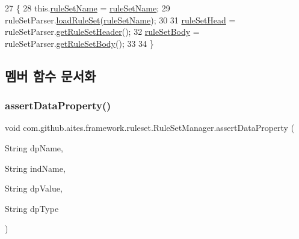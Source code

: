\begin{DoxyCode}
27                                              \{
28         this.\mbox{\hyperlink{classcom_1_1github_1_1aites_1_1framework_1_1ruleset_1_1_rule_set_manager_aeb9d61ae7f558514e41f5ed18b00a56e}{ruleSetName}} = \mbox{\hyperlink{classcom_1_1github_1_1aites_1_1framework_1_1ruleset_1_1_rule_set_manager_aeb9d61ae7f558514e41f5ed18b00a56e}{ruleSetName}};
29         ruleSetParser.\mbox{\hyperlink{classcom_1_1github_1_1aites_1_1framework_1_1ruleset_1_1_rule_set_parser_ae85e70ba4e18d5d98a4dd9a8bdb01b0b}{loadRuleSet}}(\mbox{\hyperlink{classcom_1_1github_1_1aites_1_1framework_1_1ruleset_1_1_rule_set_manager_aeb9d61ae7f558514e41f5ed18b00a56e}{ruleSetName}});
30         
31         \mbox{\hyperlink{classcom_1_1github_1_1aites_1_1framework_1_1ruleset_1_1_rule_set_manager_ae9d272c4520c18f269ac835e83be526f}{ruleSetHead}} = ruleSetParser.\mbox{\hyperlink{classcom_1_1github_1_1aites_1_1framework_1_1ruleset_1_1_rule_set_parser_a0ae3dffb9369fb6ff4e1a1f2fdede15f}{getRuleSetHeader}}();
32         \mbox{\hyperlink{classcom_1_1github_1_1aites_1_1framework_1_1ruleset_1_1_rule_set_manager_a2218521e8abc1048bd369c7ed1c14c60}{ruleSetBody}} = ruleSetParser.\mbox{\hyperlink{classcom_1_1github_1_1aites_1_1framework_1_1ruleset_1_1_rule_set_parser_a27e7145cb2cea6ccbd8996b907c6db0a}{getRuleSetBody}}();
33         
34     \}
\end{DoxyCode}


\subsection{멤버 함수 문서화}
\mbox{\label{classcom_1_1github_1_1aites_1_1framework_1_1ruleset_1_1_rule_set_manager_ae2e674642095f85bf5a8c14272e35c8a}} 
\subsubsection{\texorpdfstring{assert\+Data\+Property()}{assertDataProperty()}}
{\footnotesize\ttfamily void com.\+github.\+aites.\+framework.\+ruleset.\+Rule\+Set\+Manager.\+assert\+Data\+Property (\begin{DoxyParamCaption}\item[{String}]{dp\+Name,  }\item[{String}]{ind\+Name,  }\item[{String}]{dp\+Value,  }\item[{String}]{dp\+Type }\end{DoxyParamCaption})}



